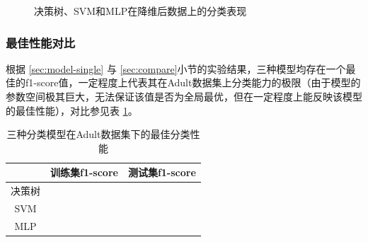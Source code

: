 \documentclass[12pt,a4paper]{article}
\theoremstyle{definition}
\begin{document}
\begin{figure}[H]
	\centering
	\caption{决策树、SVM和MLP在降维后数据上的分类表现}
	\label{fig:pca1}
\end{figure}

\subsubsection{最佳性能对比}

根据 \ref{sec:model-single} 与 \ref{sec:compare}小节的实验结果，三种模型均存在一个最佳的f1-score值，一定程度上代表其在Adult数据集上分类能力的极限（由于模型的参数空间极其巨大，无法保证该值是否为全局最优，但在一定程度上能反映该模型的最佳性能），对比参见表 \ref{tab:final_compare}。

\begin{table}[H]
	\renewcommand\arraystretch{1.35}
	\caption{三种分类模型在Adult数据集下的最佳分类性能}
	\label{tab:final_compare}
	\centering
	
	\begin{tabular}{c|c|c}
		\centering
		 & 训练集f1-score & 测试集f1-score \\
		\hline
		\hline
		
		决策树 & & \\
		SVM & & \\
		MLP & & \\	

	\end{tabular}
\end{table}
\end{document}
